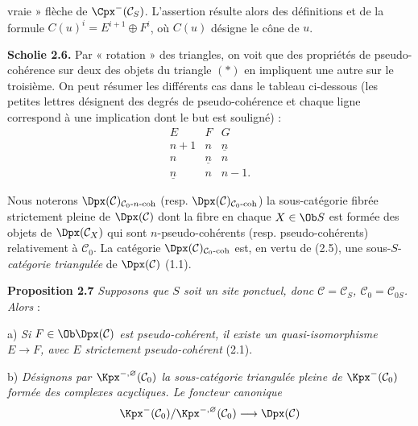 vraie » flèche de \(\Cpx^-(\mathcal C_S)\). L'assertion résulte alors des définitions et de la formule \(C(u)^i=E^{i+1}\oplus F^i\), où \(C(u)\) désigne le cône de \(u\).

\textbf{Scholie 2.6.} Par « rotation » des triangles, on voit que des propriétés de pseudo-cohérence sur deux des objets du triangle \((*)\) en impliquent une autre sur le troisième. On peut résumer les différents cas dans le tableau ci-dessous (les petites lettres désignent des degrés de pseudo-cohérence et chaque ligne correspond à une implication dont le but est souligné) :
\[
\begin{array}{ccc}
E&F&G\\[0.2em]
n+1&n&\underline n\\
n&\underline n&n\\
\underline n&n&n-1 .
\end{array}
\]

Nous noterons \(\Dpx(\mathcal C)_{\mathcal C_0\text{-}n\text{-coh}}\) (resp. \(\Dpx(\mathcal C)_{\mathcal C_0\text{-}\mathrm{coh}}\)) la sous-catégorie fibrée strictement pleine de \(\Dpx(\mathcal C)\) dont la fibre en chaque \(X\in\Ob S\) est formée des objets de \(\Dpx(\mathcal C_X)\) qui sont \(n\)-pseudo-cohérents (resp. pseudo-cohérents) relativement à \(\mathcal C_0\). La catégorie \(\Dpx(\mathcal C)_{\mathcal C_0\text{-}\mathrm{coh}}\) est, en vertu de (2.5), une sous-\(S\)-\emph{catégorie triangulée} de \(\Dpx(\mathcal C)\) (1.1).

\textbf{Proposition 2.7} \emph{Supposons que \(S\) soit un site ponctuel, donc \(\mathcal C=\mathcal C_S\), \(\mathcal C_0=\mathcal C_{0S}\). Alors} :

a) \emph{Si \(F\in\Ob\Dpx(\mathcal C)\) est pseudo-cohérent, il existe un quasi-isomorphisme \(E\longrightarrow F\), avec \(E\) strictement pseudo-cohérent} (2.1).

b) \emph{Désignons par \(\Kpx^{-,\varnothing}(\mathcal C_0)\) la sous-catégorie triangulée pleine de \(\Kpx^-(\mathcal C_0)\) formée des complexes acycliques. Le foncteur canonique}
\[
  \Kpx^-(\mathcal C_0)/\Kpx^{-,\varnothing}(\mathcal C_0)
  \longrightarrow \Dpx(\mathcal C)
\]
